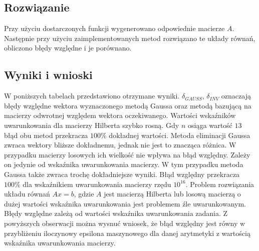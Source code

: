\documentclass{article}
\begin{document}
\subsection{Rozwiązanie}
Przy użyciu dostarczonych funkcji wygenerowano odpowiednie macierze $A$. Następnie przy użyciu zaimplementowanych metod rozwiązano te układy równań, obliczono błędy względne i je porównano.

\newpage
\subsection{Wyniki i wnioski}
W poniższych tabelach przedstawiono otrzymane wyniki. $\delta_{GAUSS}$, $\delta_{INV}$ oznaczają błędy względne wektora wyznaczonego metodą Gaussa oraz metodą bazującą na macierzy odwrotnej względem wektora oczekiwanego.
\newline Wartości wskaźników uwarunkowania dla macierzy Hilberta szybko rosną. Gdy $n$ osiąga wartość $13$ błąd obu metod przekracza $100\%$ dokładnej wartości. Metoda eliminacji Gaussa zwraca wektory bliższe dokładnemu, jednak nie jest to znacząca różnica.
\newline W przypadku macierzy losowych ich wielkość nie wpływa na błąd względny. Zależy on jedynie od wskaźnika uwarunkowania macierzy. W tym przypadku metoda Gaussa także zwraca trochę dokładniejsze wyniki. Błąd względny przekracza $100\%$ dla wskaźnikiem uwarunkowania macierzy rzędu $10^{16}$.
\newline Problem rozwiązania układu równań $Ax = b$, gdzie $A$ jest macierzą Hilberta lub losową macierzą o dużej wartości wskaźnika uwarunkowania jest problemem źle uwarunkowanym. Błędy względne zależą od wartości wskaźnika uwarunkowania zadania.  Z powyższych obserwacji można wysnuć wniosek, że błąd względny jest równy w przybliżeniu iloczynowy epsilona maszynowego dla danej arytmetyki z wartością wskaźnika uwarunkowania macierzy.
\end{document}
